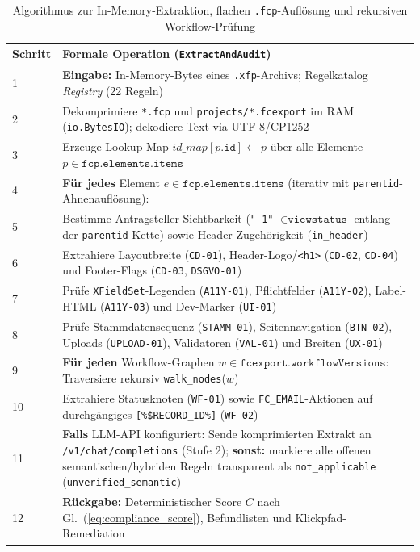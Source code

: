 \begin{table}[htbp]
\centering
\scriptsize
\begin{tabularx}{\textwidth}{lX}
\toprule
\textbf{Schritt} & \textbf{Formale Operation (\texttt{ExtractAndAudit})} \\
\midrule
1 & \textbf{Eingabe:} In-Memory-Bytes eines \texttt{.xfp}-Archivs; Regelkatalog \textit{Registry} (22 Regeln) \\
2 & Dekomprimiere \texttt{*.fcp} und \texttt{projects/*.fcexport} im RAM (\texttt{io.BytesIO}); dekodiere Text via UTF-8/CP1252 \\
3 & Erzeuge Lookup-Map $\textit{id\_map}[p.\texttt{id}] \leftarrow p$ über alle Elemente $p \in \texttt{fcp.elements.items}$ \\
4 & \textbf{Für jedes} Element $e \in \texttt{fcp.elements.items}$ (iterativ mit \texttt{parentid}-Ahnenauflösung): \\
5 & \quad Bestimme Antragsteller-Sichtbarkeit (\texttt{"-1"} $\in \texttt{viewstatus}$ entlang der \texttt{parentid}-Kette) sowie Header-Zugehörigkeit (\texttt{in\_header}) \\
6 & \quad Extrahiere Layoutbreite (\texttt{CD-01}), Header-Logo/\texttt{<h1>} (\texttt{CD-02}, \texttt{CD-04}) und Footer-Flags (\texttt{CD-03}, \texttt{DSGVO-01}) \\
7 & \quad Prüfe \texttt{XFieldSet}-Legenden (\texttt{A11Y-01}), Pflichtfelder (\texttt{A11Y-02}), Label-HTML (\texttt{A11Y-03}) und Dev-Marker (\texttt{UI-01}) \\
8 & \quad Prüfe Stammdatensequenz (\texttt{STAMM-01}), Seitennavigation (\texttt{BTN-02}), Uploads (\texttt{UPLOAD-01}), Validatoren (\texttt{VAL-01}) und Breiten (\texttt{UX-01}) \\
9 & \textbf{Für jeden} Workflow-Graphen $w \in \texttt{fcexport.workflowVersions}$: Traversiere rekursiv \texttt{walk\_nodes}($w$) \\
10 & \quad Extrahiere Statusknoten (\texttt{WF-01}) sowie \texttt{FC\_EMAIL}-Aktionen auf durchgängiges \texttt{[\%\$RECORD\_ID\%]} (\texttt{WF-02}) \\
11 & \textbf{Falls} LLM-API konfiguriert: Sende komprimierten Extrakt an \texttt{/v1/chat/completions} (Stufe 2); \textbf{sonst:} markiere alle offenen semantischen/hybriden Regeln transparent als \texttt{not\_applicable} (\texttt{unverified\_semantic}) \\
12 & \textbf{Rückgabe:} Deterministischer Score $C$ nach Gl.~(\ref{eq:compliance_score}), Befundlisten und Klickpfad-Remediation \\
\bottomrule
\end{tabularx}
\caption{Algorithmus zur In-Memory-Extraktion, flachen \texttt{.fcp}-Auflösung und rekursiven Workflow-Prüfung}
\label{tab:algo_traversal}
\end{table}

